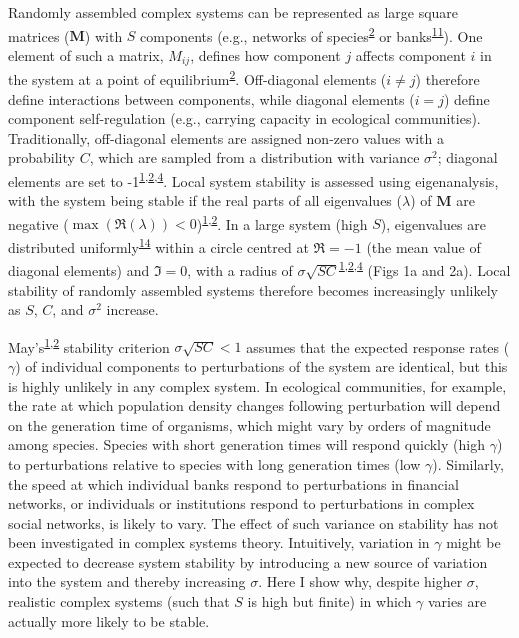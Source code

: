\documentclass[]{article}
\begin{document}
Randomly assembled complex systems can be represented as large square
matrices (\(\mathbf{M}\)) with \(S\) components (e.g., networks of
species\textsuperscript{\protect\hyperlink{ref-Allesina2012}{2}} or
banks\textsuperscript{\protect\hyperlink{ref-Haldane2011}{11}}). One
element of such a matrix, \(M_{ij}\), defines how component \(j\)
affects component \(i\) in the system at a point of
equilibrium\textsuperscript{\protect\hyperlink{ref-Allesina2012}{2}}.
Off-diagonal elements (\(i \neq j\)) therefore define interactions
between components, while diagonal elements (\(i = j\)) define component
self-regulation (e.g., carrying capacity in ecological communities).
Traditionally, off-diagonal elements are assigned non-zero values with a
probability \(C\), which are sampled from a distribution with variance
\(\sigma^{2}\); diagonal elements are set to
-1\textsuperscript{\protect\hyperlink{ref-May1972}{1},\protect\hyperlink{ref-Allesina2012}{2},\protect\hyperlink{ref-Allesina2015}{4}}.
Local system stability is assessed using eigenanalysis, with the system
being stable if the real parts of all eigenvalues (\(\lambda\)) of
\(\mathbf{M}\) are negative
(\(\max\left(\Re(\lambda)\right) < 0\))\textsuperscript{\protect\hyperlink{ref-May1972}{1},\protect\hyperlink{ref-Allesina2012}{2}}.
In a large system (high \(S\)), eigenvalues are distributed
uniformly\textsuperscript{\protect\hyperlink{ref-Tao2010}{14}} within a
circle centred at \(\Re = -1\) (the mean value of diagonal elements) and
\(\Im = 0\), with a radius of
\(\sigma\sqrt{SC}\)\textsuperscript{\protect\hyperlink{ref-May1972}{1},\protect\hyperlink{ref-Allesina2012}{2},\protect\hyperlink{ref-Allesina2015}{4}}
(Figs 1a and 2a). Local stability of randomly assembled systems
therefore becomes increasingly unlikely as \(S\), \(C\), and
\(\sigma^{2}\) increase.

May's\textsuperscript{\protect\hyperlink{ref-May1972}{1},\protect\hyperlink{ref-Allesina2012}{2}}
stability criterion \(\sigma\sqrt{SC} < 1\) assumes that the expected
response rates (\(\gamma\)) of individual components to perturbations of
the system are identical, but this is highly unlikely in any complex
system. In ecological communities, for example, the rate at which
population density changes following perturbation will depend on the
generation time of organisms, which might vary by orders of magnitude
among species. Species with short generation times will respond quickly
(high \(\gamma\)) to perturbations relative to species with long
generation times (low \(\gamma\)). Similarly, the speed at which
individual banks respond to perturbations in financial networks, or
individuals or institutions respond to perturbations in complex social
networks, is likely to vary. The effect of such variance on stability
has not been investigated in complex systems theory. Intuitively,
variation in \(\gamma\) might be expected to decrease system stability
by introducing a new source of variation into the system and thereby
increasing \(\sigma\). Here I show why, despite higher \(\sigma\),
realistic complex systems (such that \(S\) is high but finite) in which
\(\gamma\) varies are actually more likely to be stable.
\end{document}
